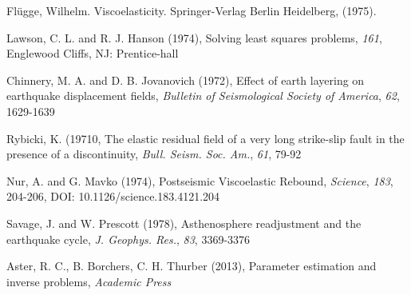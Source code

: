 \documentclass[12pt]{article}
\begin{document}
\begin{thebibliography}{}



 Fl\"ugge,
  Wilhelm. Viscoelasticity. Springer-Verlag Berlin Heidelberg, (1975).

 Lawson, C. L. and
  R. J. Hanson (1974), Solving least squares problems, {\textit{161}},
  Englewood Cliffs, NJ: Prentice-hall

 Chinnery,
  M. A. and D. B. Jovanovich (1972), Effect of earth layering on
  earthquake displacement fields, {\textit{Bulletin of Seismological
      Society of America}}, \textit{62}, 1629-1639

 Rybicki, K. (19710, The
  elastic residual field of a very long strike-slip fault in the
  presence of a discontinuity, {\textit{Bull. Seism. Soc. Am.}},
  \textit{61}, 79-92

 Nur, A. and G. Mavko
  (1974), Postseismic Viscoelastic Rebound, {\textit{Science}},
  \textit{183}, 204-206, DOI: 10.1126/science.183.4121.204

 Savage, J. and
  W. Prescott (1978), Asthenosphere readjustment and the earthquake
  cycle, {\it J. Geophys. Res.}, \textit{83}, 3369-3376

 Aster, R. C., B. Borchers,
  C. H. Thurber (2013), Parameter estimation and inverse
  problems, {\textit{Academic Press}}


\end{thebibliography}
\end{document}
